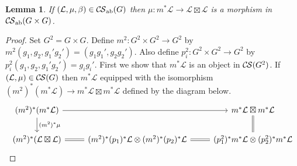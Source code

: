 \documentclass[10pt]{amsart}
\theoremstyle{plain}
\newtheorem{lemma}[theorem]{Lemma}
\theoremstyle{definition}
\newcommand{\ab}{_{\operatorname{ab}}}
\newcommand{\cs}[1]{{\mathcal{#1}}}
\newcommand{\CS}{{\mathcal{C\hskip-0.8pt S}}}
\begin{document}
\fi

\begin{lemma}
If $(\cs{L},\mu,\beta)\in \CS\ab(G)$ then $\mu  : m^*\cs{L} \to \cs{L}\boxtimes\cs{L}$ is a morphism in $\CS\ab(G\times G)$.
\end{lemma}
\begin{proof}
Set $G^2 = G\times G$. Define $m^2 : G^2\times G^2 \to G^2$ by $m^2(g_1,g_2,g_1'g_2') = (g_1g_1',g_2g_2')$. Also define $p^2_i : G^2\times G^2 \to G^2$ by $p^2_i(g_1,g_2,g_1'g_2') = g_i g_i'$.
First we show that $m^*\cs{L}$ is an object in $\CS(G^2)$.
If $(\cs{L},\mu) \in \CS(G)$ then $m^*\cs{L}$ equipped with the isomorphism $(m^2)^* (m^*\cs{L}) \to m^*\cs{L} \boxtimes m^*\cs{L}$ defined by the diagram below.
\[
\begin{tikzcd}
(m^2)^* (m^*\cs{L}) \arrow{d}{(m^2)^*\mu} \arrow{rr} && m^*\cs{L} \boxtimes m^*\cs{L}\\
 (m^2)^*(\cs{L}\boxtimes\cs{L}) \arrow[equal]{r} & (m^2)^*(p_1)^*\cs{L} \otimes (m^2)^*(p_2)^*\cs{L} \arrow[equal]{r} & (p^2_1)^*m^*\cs{L} \otimes (p^2_2)^*m^*\cs{L} \arrow[equal]{u}
\end{tikzcd}
\] 
\end{proof}
\end{document}

